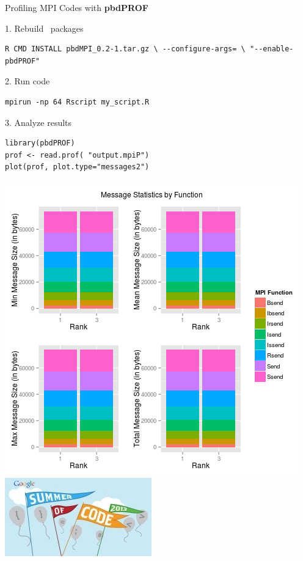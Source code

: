 \begin{frame}[fragile]
  \begin{block}{Profiling MPI Codes with \textbf{pbdPROF}}
  \begin{minipage}[t]{.58\textwidth}
  \vspace{.2cm}
  \vspace{0pt}
  1. Rebuild \pbdR\ packages
\vspace*{-.5cm}
\begin{lstlisting}[language=shl,title=\ ]
R CMD INSTALL pbdMPI_0.2-1.tar.gz \ --configure-args= \ "--enable-pbdPROF"
\end{lstlisting}
2. Run code
\vspace*{-.5cm}
\begin{lstlisting}[language=shl,title=\ ]
mpirun -np 64 Rscript my_script.R
\end{lstlisting}

3. Analyze results
\vspace{-.5cm}
\begin{lstlisting}[title=\ ]
library(pbdPROF)
prof <- read.prof( "output.mpiP")
plot(prof, plot.type="messages2")
\end{lstlisting}

  \end{minipage}
  \hfill
  \begin{minipage}[t]{.4\textwidth}
  \vspace{0pt}
    \centering
    \includegraphics[scale=.25]{../common/pics/mpip}
    \\[.1cm]
    \includegraphics[scale=0.35]{../common/pics/gsoc}
  \end{minipage}
  \end{block}
\end{frame}
